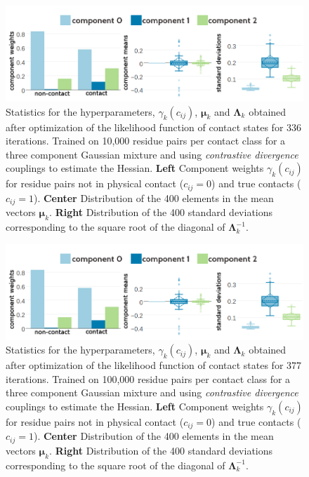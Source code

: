 \documentclass[11pt,a4paper,twoside]{book}
\newcommand{\eq}{\!=\!}
\newcommand{\Lk}{\mathbf{\Lambda}_k}
\newcommand{\muk}{\mathbf{\mu}_k}
\newcommand{\cij}{c_{ij}}
\theoremstyle{definition}
\theoremstyle{definition}
\theoremstyle{remark}
\begin{document}
\begin{figure}
\includegraphics[width=1\linewidth]{img/bayesian_model/cd/3/stats-cd-3comp-100k} \caption{Statistics for the hyperparameters,
\(\gamma_k(\cij)\), \(\muk\) and \(\Lk\) obtained after optimization of
the likelihood function of contact states for 336 iterations. Trained on
10,000 residue pairs per contact class for a three component Gaussian
mixture and using \emph{contrastive divergence} couplings to estimate
the Hessian. \textbf{Left} Component weights \(\gamma_k(\cij)\) for
residue pairs not in physical contact (\(\cij \eq 0\)) and true contacts
(\(\cij \eq 1\)). \textbf{Center} Distribution of the 400 elements in
the mean vectors \(\muk\). \textbf{Right} Distribution of the 400
standard deviations corresponding to the square root of the diagonal of
\(\Lk^{-1}\).}\label{fig:stats-cd-3comp-10k}
\end{figure}













\begin{figure}
\includegraphics[width=1\linewidth]{img/bayesian_model/cd/3/stats-cd-3comp-100k} \caption{Statistics for the hyperparameters,
\(\gamma_k(\cij)\), \(\muk\) and \(\Lk\) obtained after optimization of
the likelihood function of contact states for 377 iterations. Trained on
100,000 residue pairs per contact class for a three component Gaussian
mixture and using \emph{contrastive divergence} couplings to estimate
the Hessian. \textbf{Left} Component weights \(\gamma_k(\cij)\) for
residue pairs not in physical contact (\(\cij \eq 0\)) and true contacts
(\(\cij \eq 1\)). \textbf{Center} Distribution of the 400 elements in
the mean vectors \(\muk\). \textbf{Right} Distribution of the 400
standard deviations corresponding to the square root of the diagonal of
\(\Lk^{-1}\).}\label{fig:stats-cd-3comp-100k}
\end{figure}
\end{document}

